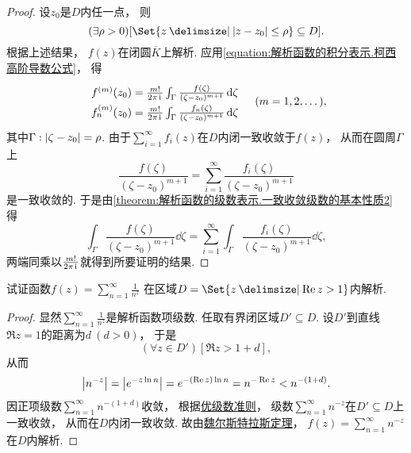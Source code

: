\begin{theorem}[魏尔斯特拉斯定理]
\begin{proof}
\def\f#1{f\ifx\relax#1\relax\else_{#1}\fi^{(m)}(z_0) = \frac{m!}{2\pi\iu} \int_\Gamma \frac{f\ifx\relax#1\relax\else_{#1}\fi(\zeta)}{(\zeta-z_0)^{m+1}} \dd{\zeta}}
设\(z_0\)是\(D\)内任一点，
则\[
	(\exists \rho > 0)
	[\Set{ z \given \abs{z-z_0} \leq \rho } \subseteq D].
\]
根据上述结果，
\(f(z)\)在闭圆\(\overline{K}\)上解析.
应用\cref{equation:解析函数的积分表示.柯西高阶导数公式}，
得\[
	\def\arraystretch{1.5}
	\begin{array}{l}
	\f{} \\
	\f{n}
	\end{array}
	\quad(m=1,2,\dotsc),
\]
其中\(\Gamma: \abs{\zeta-z_0}=\rho\).
由于\(\sum_{i=1}^\infty f_i(z)\)在\(D\)内闭一致收敛于\(f(z)\)，
从而在圆周\(\Gamma\)上\[
	\frac{f(\zeta)}{(\zeta-z_0)^{m+1}}
	= \sum_{i=1}^\infty \frac{f_i(\zeta)}{(\zeta-z_0)^{m+1}}
\]是一致收敛的.
于是由\cref{theorem:解析函数的级数表示.一致收敛级数的基本性质2} 得\[
	\int_\Gamma \frac{f(\zeta)}{(\zeta-z_0)^{m+1}} \dd{\zeta}
	= \sum_{i=1}^\infty \int_\Gamma \frac{f_i(\zeta)}{(\zeta-z_0)^{m+1}} \dd{\zeta},
\]
两端同乘以\(\frac{m!}{2\pi\kern1pt\mathrm{i}\kern1pt}\)就得到所要证明的结果.
\end{proof}
\end{theorem}

\begin{example}
试证函数\(f(z) = \sum_{n=1}^\infty \frac{1}{n^z}\)
在区域\(D = \Set{ z \given \Re z > 1 }\)内解析.
\begin{proof}
显然\(\sum_{n=1}^\infty \frac{1}{n^z}\)是解析函数项级数.
任取有界闭区域\(D' \subseteq D\).
设\(D'\)到直线\(\Re z = 1\)的距离为\(d\ (d > 0)\)，
于是\[
	(\forall z \in D')
	[\Re z > 1+d],
\]
从而\[
	\abs{n^{-z}} = \abs{e^{-z \ln n}}
	= e^{-(\Re z) \ln n} = n^{-\Re z}
	< n^{-(1+d)}.
\]
因正项级数\(\sum_{n=1}^\infty n^{-(1+d)}\)收敛，
根据\hyperref[theorem:无穷级数.优级数准则]{优级数准则}，
级数\(\sum_{n=1}^\infty n^{-z}\)在\(D' \subseteq D\)上一致收敛，
从而在\(D\)内闭一致收敛.
故由\hyperref[theorem:解析函数的级数表示.魏尔斯特拉斯定理]{魏尔斯特拉斯定理}，
\(f(z) = \sum_{n=1}^\infty n^{-z}\)在\(D\)内解析.
\end{proof}
\end{example}
